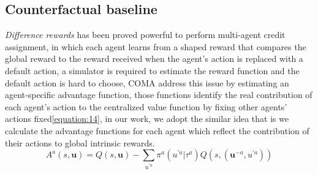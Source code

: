 \documentclass{article} %
\begin{document}
\subsection{Counterfactual baseline}
\emph{Difference rewards} has been proved powerful to perform multi-agent credit assignment, in which each agent learns from a shaped reward that compares the global
reward to the reward received when the agent's action is replaced with a default action, a simulator is required to estimate the reward function and the default action is hard to choose, COMA address this issue by estimating an agent-specific advantage function, those functions identify the real contribution of each agent's action to the centralized value function by fixing other agents' actions fixed\ref{equation:14}, in our work, we adopt the similar idea that is we calculate the advantage functions for each agent which reflect the contribution of their actions to global intrinsic rewards.
\begin{equation}
\label{equation:14}
    A^{a}(s, \mathbf{u})=Q(s, \mathbf{u})-\sum_{u^{\prime a}} \pi^{a}\left(u^{\prime a} | \tau^{a}\right) Q\left(s,\left(\mathbf{u}^{-a}, u^{\prime a}\right)\right)
\end{equation}

\iffalse
\end{document}
